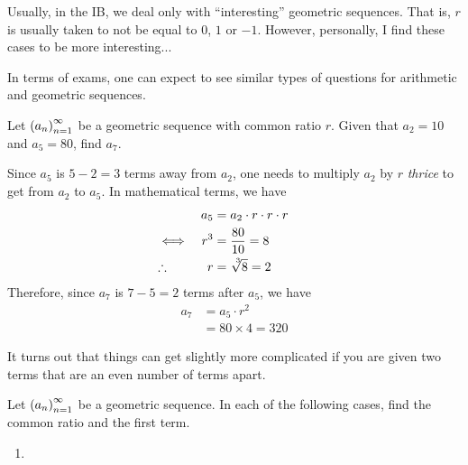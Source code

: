 \begin{remark}
    Usually, in the IB, we deal only with ``interesting'' geometric sequences. That is, $r$ is usually taken to not be equal to $0$, $1$ or $-1$. However, personally, I find these cases to be more interesting...
\end{remark}

In terms of exams, one can expect to see similar types of questions for arithmetic and geometric sequences.
\begin{boxexample}
    Let $\left( a_n \right)_{n=1}^{\infty}$ be a geometric sequence with common ratio $r$. Given that $a_2 = 10$ and $a_5 = 80$, find $a_7$.
    \begin{solution}
        Since $a_5$ is $5 - 2 = 3$ terms away from $a_2$, one needs to multiply $a_2$ by $r$ \textit{thrice} to get from $a_2$ to $a_5$. In mathematical terms, we have
        \begin{align*}
            && a_5 &= a_2 \cdot r \cdot r \cdot r &&& \\
            &\iff& r^3 &= \frac{80}{10} = 8 &&& \\
            &\ergo& r &= \cbrt{8} = 2
        \end{align*}
        Therefore, since $a_7$ is $7 - 5 = 2$ terms after $a_5$, we have
        \begin{align*}
            a_7 &= a_5 \cdot r^2 \\
            &= 80 \times 4 = 320
        \end{align*}
        \vspace{-2em}
    \end{solution}
\end{boxexample}

It turns out that things can get slightly more complicated if you are given two terms that are an even number of terms apart.

\begin{boxexercise}
    Let $\left( a_n \right)_{n=1}^{\infty}$ be a geometric sequence. In each of the following cases, find the common ratio and the first term.
    \begin{enumerate}
        \item 
    \end{enumerate}
\end{boxexercise}